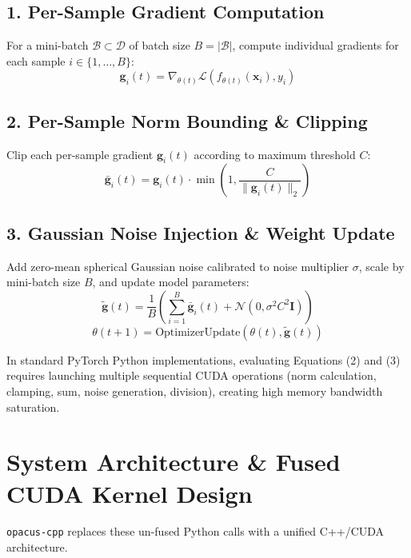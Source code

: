\documentclass[11pt,onecolumn,a4paper]{article}
\begin{document}
\subsection{1. Per-Sample Gradient Computation}
For a mini-batch $\mathcal{B} \subset \mathcal{D}$ of batch size $B = |\mathcal{B}|$, compute individual gradients for each sample $i \in \{1, \dots, B\}$:
\begin{equation}
    \mathbf{g}_i(t) = \nabla_{\theta(t)} \mathcal{L}\left( f_{\theta(t)}(\mathbf{x}_i), y_i \right)
\end{equation}

\subsection{2. Per-Sample Norm Bounding \& Clipping}
Clip each per-sample gradient $\mathbf{g}_i(t)$ according to maximum threshold $C$:
\begin{equation}
    \bar{\mathbf{g}}_i(t) = \mathbf{g}_i(t) \cdot \min\left(1, \frac{C}{\|\mathbf{g}_i(t)\|_2}\right)
\end{equation}

\subsection{3. Gaussian Noise Injection \& Weight Update}
Add zero-mean spherical Gaussian noise calibrated to noise multiplier $\sigma$, scale by mini-batch size $B$, and update model parameters:
\begin{equation}
    \tilde{\mathbf{g}}(t) = \frac{1}{B} \left( \sum_{i=1}^{B} \bar{\mathbf{g}}_i(t) + \mathcal{N}\left(0, \sigma^2 C^2 \mathbf{I}\right) \right)
\end{equation}
\begin{equation}
    \theta(t+1) = \text{OptimizerUpdate}\left( \theta(t), \tilde{\mathbf{g}}(t) \right)
\end{equation}

In standard PyTorch Python implementations, evaluating Equations (2) and (3) requires launching multiple sequential CUDA operations (norm calculation, clamping, sum, noise generation, division), creating high memory bandwidth saturation.

\section{System Architecture \& Fused CUDA Kernel Design}

\texttt{opacus-cpp} replaces these un-fused Python calls with a unified C++/CUDA architecture.
\end{document}
